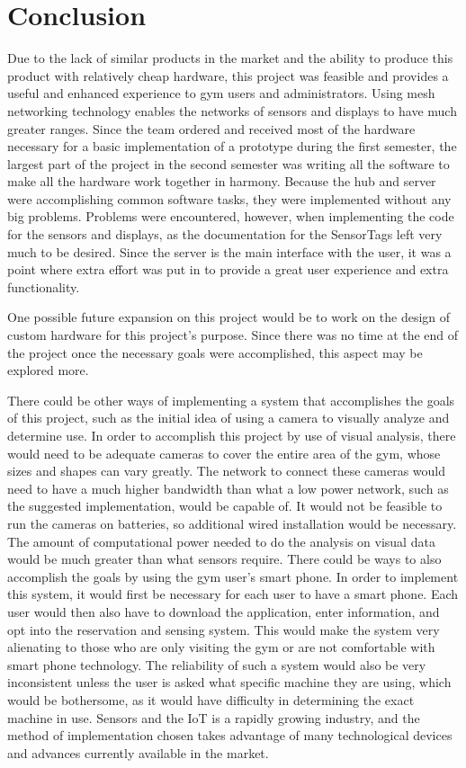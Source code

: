 \documentclass[PPFS.tex]{template/subfiles}
\begin{document}
\section{Conclusion}
Due to the lack of similar products in the market and the ability to produce this product with relatively cheap hardware, this project was feasible and provides a useful and enhanced experience to gym users and administrators. Using mesh networking technology enables the networks of sensors and displays to have much greater ranges. 
Since the team ordered and received most of the hardware necessary for a basic implementation of a prototype during the first semester, the largest part of the project in the second semester was writing all the software to make all the hardware work together in harmony. Because the hub and server were accomplishing common software tasks, they were implemented without any big problems. Problems were encountered, however, when implementing the code for the sensors and displays, as the documentation for the SensorTags left very much to be desired. Since the server is the main interface with the user, it was a point where extra effort was put in to provide a great user experience and extra functionality.

One possible future expansion on this project would be to work on the design of custom hardware for this project's purpose. Since there was no time at the end of the project once the necessary goals were accomplished, this aspect may be explored more.

There could be other ways of implementing a system that accomplishes the goals of this project, such as the initial idea of using a camera to visually analyze and determine use. In order to accomplish this project by use of visual analysis, there would need to be adequate cameras to cover the entire area of the gym, whose sizes and shapes can vary greatly. The network to connect these cameras would need to have a much higher bandwidth than what a low power network, such as the suggested implementation, would be capable of. It would not be feasible to run the cameras on batteries, so additional wired installation would be necessary. The amount of computational power needed to do the analysis on visual data would be much greater than what sensors require. There could be ways to also accomplish the goals by using the gym user's smart phone. In order to implement this system, it would first be necessary for each user to have a smart phone. Each user would then also have to download the application, enter information, and opt into the reservation and sensing system. This would make the system very alienating to those who are only visiting the gym or are not comfortable with smart phone technology. The reliability of such a system would also be very inconsistent unless the user is asked what specific machine they are using, which would be bothersome, as it would have difficulty in determining the exact machine in use. Sensors and the IoT is a rapidly growing industry, and the method of implementation chosen takes advantage of many technological devices and advances currently available in the market.
\end{document}
